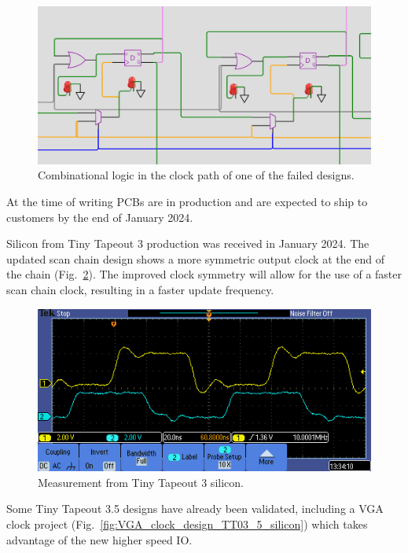 \begin{figure}[!t]
\centering
\includegraphics[width=\columnwidth]{./Figs/wokwi mux clock logic.png}
\caption{Combinational logic in the clock path of one of the failed designs.}
\label{fig:failed_design_comb_logic}
\end{figure}

At the time of writing PCBs are in production and are expected to ship to customers by the end of January 2024.

Silicon from Tiny Tapeout 3 production was received in January 2024. The updated scan chain design shows a more symmetric output clock at the end of the chain (Fig.~\ref{fig:TT03_silicon_measurement}). The improved clock symmetry will allow for the use of a faster scan chain clock, resulting in a faster update frequency.

\begin{figure}[!t]
\centering
\includegraphics[width=\columnwidth]{./Figs/tt03_clock_out.png}
\caption{Measurement from Tiny Tapeout 3 silicon.}
\label{fig:TT03_silicon_measurement}
\end{figure}

Some Tiny Tapeout 3.5 designs have already been validated, including a VGA clock project (Fig.~\ref{fig:VGA_clock_design_TT03_5_silicon}) which takes advantage of the new higher speed IO.

